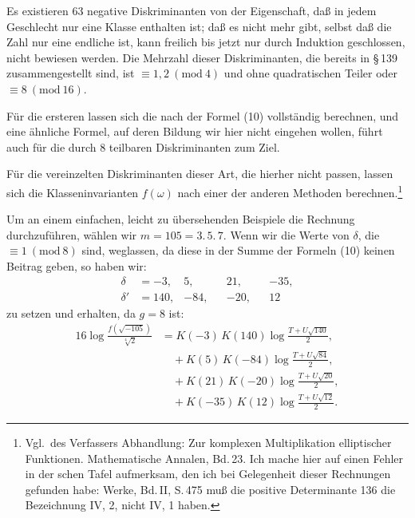 Es existieren 63 negative Diskriminanten von der Eigenschaft, daß in jedem Geschlecht nur eine Klasse enthalten ist; daß es nicht mehr gibt, selbst daß die Zahl nur eine endliche ist, kann freilich bis jetzt nur durch Induktion geschlossen, nicht bewiesen werden. Die Mehrzahl dieser Diskriminanten, die bereits in \S\,139 zusammengestellt sind, ist $\equiv 1, 2\ (\mathrm{mod}\ 4)$ und ohne quadratischen Teiler oder $\equiv 8\ (\mathrm{mod}\ 16)$.

Für die ersteren lassen sich die  nach der Formel (10) vollständig berechnen, und eine ähnliche Formel, auf deren Bildung wir hier nicht eingehen wollen, führt auch für die durch 8 teilbaren Diskriminanten zum Ziel.

Für die vereinzelten Diskriminanten dieser Art, die hierher nicht passen, lassen sich die Klasseninvarianten $f(\omega)$ nach einer der anderen Methoden berechnen.\footnote{Vgl.\ des Verfassers Abhandlung: \glqq Zur komplexen Multiplikation elliptischer Funktionen\grqq{}. Mathematische Annalen, Bd.\,23. Ich mache hier auf einen Fehler in der schen Tafel aufmerksam, den ich bei Gelegenheit dieser Rechnungen gefunden habe:  Werke, Bd.\,II, S.\,475 muß die positive Determinante 136 die Bezeichnung IV, 2, nicht IV, 1 haben.}

Um an einem einfachen, leicht zu übersehenden Beispiele die Rechnung durchzuführen, wählen wir $m=105=3.\,5.\,7$. Wenn wir die Werte von $\delta$, die $\equiv 1\ (\mathrm{mod}\ 8)$ sind, weglassen, da diese in der Summe der Formeln (10) keinen Beitrag geben, so haben wir:
\[
\begin{aligned}
\delta &= -3, & 5, & & 21, & & -35, \\
\delta' &= 140, & -84, & & -20, & & 12
\end{aligned}
\]
zu setzen und erhalten, da $g=8$ ist:
\[
\begin{aligned}
16\log\frac{f(\sqrt{-105})}{\sqrt[4]{2}} &= K(-3)\,K(140)\log\frac{T+U\sqrt{140}}{2}, \\
&\quad + K(5)\,K(-84)\log\frac{T+U\sqrt{84}}{2}, \\
&\quad + K(21)\,K(-20)\log\frac{T+U\sqrt{20}}{2}, \\
&\quad + K(-35)\,K(12)\log\frac{T+U\sqrt{12}}{2}.
\end{aligned}
\]
